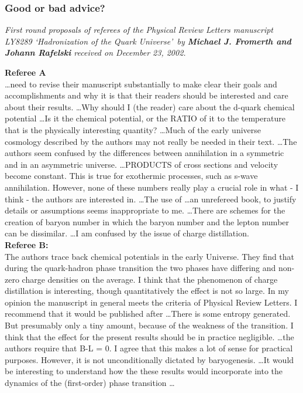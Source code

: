 \subsubsection{Good or bad advice?}
\noindent\textit{First round proposals of referees of the  Physical Review Letters manuscript LY8289 \lq Hadronization of the Quark Universe\rq\  by \textbf{Michael J. Fromerth and Johann Rafelski} received  on December 23,  2002.}\\[-0.7cm]
%
\begin{mdframed}[linecolor=gray,roundcorner=12pt,backgroundcolor=GreenYellow!15,linewidth=1pt,leftmargin=0cm,rightmargin=0cm,topline=true,bottomline=true,skipabove=12pt]\relax%
% 
\textbf{Referee A}\\
\indent \ldots need to revise their manuscript substantially to make clear their goals and accomplishments and why it is that their readers should be interested and care about their results. \ldots  Why should I (the reader) care about the d-quark chemical potential \ldots Is it the chemical potential, or the RATIO of it to the temperature that is the physically interesting quantity? \ldots  Much of the early universe cosmology described by the authors may not really be needed in their text. \ldots The authors seem confused by the differences between annihilation in a symmetric and in an asymmetric universe. \ldots PRODUCTS of cross sections and velocity become constant. This is true for exothermic processes, such as s-wave annihilation. However, none of these numbers really play a crucial role in what - I think - the authors are interested in. \ldots The use of \ldots  an unrefereed book, to justify details or assumptions seems inappropriate to me. \ldots There are schemes for the creation of baryon number in which the baryon number and the lepton number can be dissimilar. \ldots  I am confused by the issue of charge distillation.\\

\noindent\textbf{Referee B:}\\
\indent The authors trace back chemical potentials in the early Universe. They find that during the quark-hadron phase transition the two phases have differing and non-zero charge densities on the average. I think that the phenomenon of charge distillation is interesting, though quantitatively the effect is not so large. In my opinion the manuscript in general meets the criteria of Physical Review Letters. I recommend that it would be published after \ldots  There is some entropy generated. But presumably only a tiny amount, because of the weakness of the transition. I think that the effect for the present results should be in practice negligible. \ldots  the authors require that B-L = 0. I agree that this makes a lot of sense for practical purposes. However, it is not unconditionally dictated by baryogenesis. \ldots It would be interesting to understand how the these results would incorporate into the dynamics of the (first-order) phase transition \ldots
\end{mdframed}
\vskip 0.5cm 


